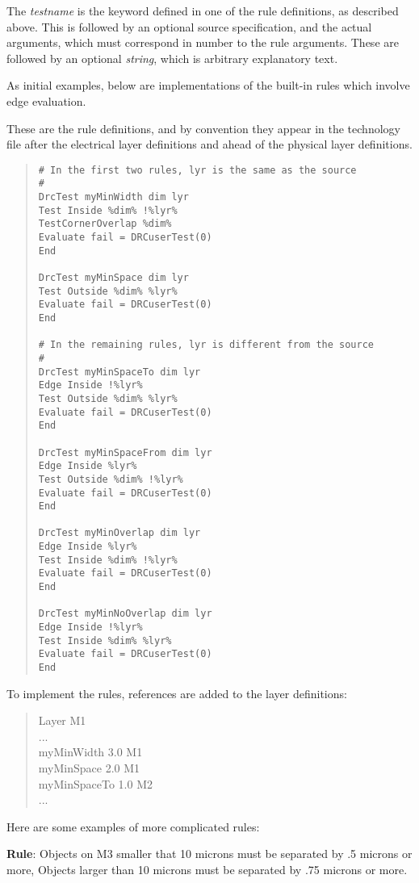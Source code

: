 The {\it testname} is the keyword defined in one of the rule
definitions, as described above.  This is followed by an optional
source specification, and the actual arguments, which must correspond
in number to the rule arguments.  These are followed by an optional
{\it string}, which is arbitrary explanatory text.

As initial examples, below are implementations of the built-in
rules which involve edge evaluation.

These are the rule definitions, and by convention they appear in the
technology file after the electrical layer definitions and ahead of
the physical layer definitions.

\begin{quote}
\begin{verbatim}
# In the first two rules, lyr is the same as the source
#
DrcTest myMinWidth dim lyr
Test Inside %dim% !%lyr%
TestCornerOverlap %dim%
Evaluate fail = DRCuserTest(0)
End

DrcTest myMinSpace dim lyr
Test Outside %dim% %lyr%
Evaluate fail = DRCuserTest(0)
End

# In the remaining rules, lyr is different from the source
#
DrcTest myMinSpaceTo dim lyr
Edge Inside !%lyr%
Test Outside %dim% %lyr%
Evaluate fail = DRCuserTest(0)
End

DrcTest myMinSpaceFrom dim lyr
Edge Inside %lyr%
Test Outside %dim% !%lyr%
Evaluate fail = DRCuserTest(0)
End

DrcTest myMinOverlap dim lyr
Edge Inside %lyr%
Test Inside %dim% !%lyr%
Evaluate fail = DRCuserTest(0)
End

DrcTest myMinNoOverlap dim lyr
Edge Inside !%lyr%
Test Inside %dim% %lyr%
Evaluate fail = DRCuserTest(0)
End
\end{verbatim}
\end{quote}

To implement the rules, references are added to the layer definitions:

\begin{quote}\vt
Layer M1\\
...\\
myMinWidth  3.0 M1\\
myMinSpace  2.0 M1\\
myMinSpaceTo 1.0 M2\\
...
\end{quote}

Here are some examples of more complicated rules:

\begin{description}
\item{{\bf Rule}:  Objects on M3 smaller that 10 microns must be
separated by .5 microns or more, Objects larger than 10 microns must
be separated by .75 microns or more.}
\end{description}

